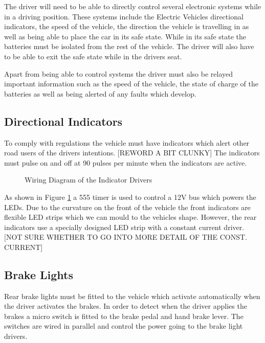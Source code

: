 The driver will need to be able to directly control several electronic systems while in a driving position. These systems include the Electric Vehicles directional indicators, the speed of the vehicle, the direction the vehicle is travelling in as well as being able to place the car in its safe state. While in its safe state the batteries must be isolated from the rest of the vehicle. The driver will also have to be able to exit the safe state while in the drivers seat. 

Apart from being able to control systems the driver must also be relayed important information such as the speed of the vehicle, the state of charge of the batteries as well as being alerted of any faults which develop.

\subsection{Directional Indicators}

To comply with regulations the vehicle must have indicators which alert other road users of the drivers intentions. [REWORD A BIT CLUNKY] The indicators must pulse on and off at 90 pulses per minute when the indicators are active. 

\begin{figure}[H]

\caption{Wiring Diagram of the Indicator Drivers}
\label{Fig:IndicatorWiring}
\end{figure}

As shown in Figure \ref{Fig:IndicatorWiring} a 555 timer is used to control a 12V bus which powers the LEDs. Due to the curvature on the front of the vehicle the front indicators are flexible LED strips which we can mould to the vehicles shape. However, the rear indicators use a specially designed LED strip with a constant current driver. [NOT SURE WHETHER TO GO INTO MORE DETAIL OF THE CONST. CURRENT]

\subsection{Brake Lights}

Rear brake lights must be fitted to the vehicle which activate automatically when the driver activates the brakes. In order to detect when the driver applies the brakes a micro switch is fitted to the brake pedal and hand brake lever. The switches are wired in parallel and control the power going to the brake light drivers. 

